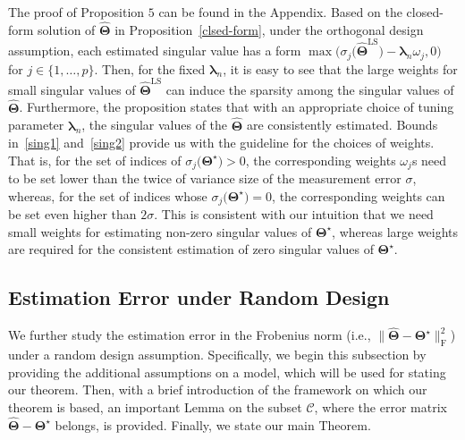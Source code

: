 \documentclass[alpha-refs]{wiley-article}
\begin{document}
The proof of Proposition $5$ can be found in the Appendix.
Based on the closed-form solution of $\widehat{\boldsymbol{\Theta}}$ in Proposition~\ref{clsed-form}, under the orthogonal design assumption, each estimated singular value has a form $\max \big( \sigma_{j}\big(\widehat{\boldsymbol{\Theta}}^{\text{LS}}\big)-\boldsymbol{\lambda}_{n} \omega_{j},0 \big)$ for $j\in\{1,\dots,p\}$.
Then, for the fixed $\boldsymbol{\lambda}_{n}$, it is easy to see that the large weights for small singular values of $\widehat{\boldsymbol{\Theta}}^{\text{LS}}$ can induce the sparsity among the singular values of $\widehat{\boldsymbol{\Theta}}$.
Furthermore, the proposition states that with an appropriate choice of tuning parameter $\boldsymbol{\lambda}_{n}$, the singular values of the $\widehat{\boldsymbol{\Theta}}$ are consistently estimated.
Bounds in~\eqref{sing1} and~\eqref{sing2} provide us with the guideline for the choices of weights.
That is, for the set of indices of $\sigma_{j}\big(\boldsymbol{\Theta}^{\star}\big)>0$, the corresponding weights $\omega_{j}$s need to be set lower than the twice of variance size of the measurement error $\sigma$, whereas, for the set of indices whose $\sigma_{j}\big(\boldsymbol{\Theta}^{\star}\big)=0$, the corresponding weights can be set even higher than $2\sigma$.
This is consistent with our intuition that we need small weights for estimating non-zero singular values of $\boldsymbol{\Theta}^{\star}$, whereas large weights are required for the consistent estimation of zero singular values of $\boldsymbol{\Theta}^{\star}$.

\subsection{Estimation Error under Random Design}
We further study the estimation error in the Frobenius norm (i.e., $\| \widehat{\boldsymbol{\Theta}} - \boldsymbol{\Theta^{\star}} \|_{\text{F}}^{2}$)  under a random design assumption.
Specifically, we begin this subsection by providing the additional assumptions on a model, which will be used for stating our theorem.
Then, with a brief introduction of the framework on which our theorem is based, an important Lemma on the subset $\mathcal{C}$, where the error matrix $\widehat{\boldsymbol{\Theta}}-\boldsymbol{\Theta^{\star}}$ belongs, is provided.
Finally, we state our main Theorem.
\end{document}
